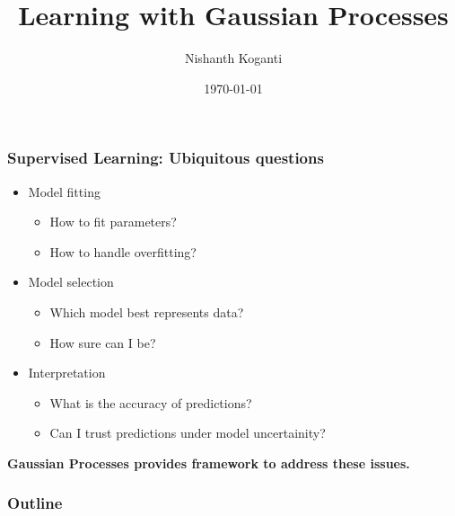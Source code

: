 \documentclass[10pt]{beamer}
\title{Learning with Gaussian Processes}
\author{Nishanth Koganti}
\date{\today}
\begin{document}
  \begin{frame}
    \titlepage
  \end{frame}

  \begin{frame}
    \frametitle{Supervised Learning: Ubiquitous questions}

    \begin{itemize}
      \item Model fitting
      \begin{itemize}
        \item How to fit parameters?
        \item How to handle overfitting?
      \end{itemize}

      \item Model selection
      \begin{itemize}
        \item Which model best represents data?
        \item How sure can I be?
      \end{itemize}

      \item Interpretation
      \begin{itemize}
        \item What is the accuracy of predictions?
        \item Can I trust predictions under model uncertainity?
      \end{itemize}
    \end{itemize}

    \begin{center}
      \textbf{Gaussian Processes provides framework to address these issues.}
    \end{center}
  \end{frame}

  \begin{frame}
    \frametitle{Outline}
    \tableofcontents
  \end{frame}
\end{document}
